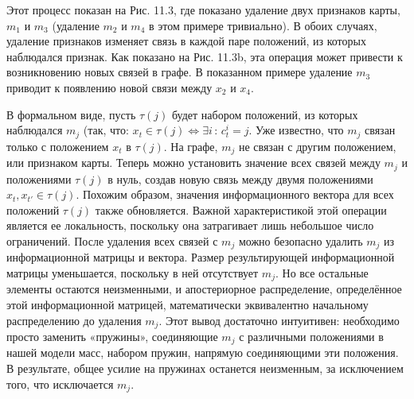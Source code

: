 \documentclass[10pt,a4paper]{article}
\begin{document}
Этот процесс показан на Рис. 11.3, где показано удаление двух признаков карты, $m_1$ и $m_3$ (удаление $m_2$ и $m_4$ в этом примере тривиально). В обоих случаях, удаление признаков изменяет связь в каждой паре положений, из которых наблюдался признак. Как показано на Рис. 11.3b, эта операция может привести к возникновению новых связей в графе. В показанном примере удаление $m_3$ приводит к появлению новой связи между $x_2$ и $x_4$.

В формальном виде, пусть $\tau(j)$ будет набором положений, из которых наблюдался $m_j$ (так, что: 
$x_t\in\tau(j)\Longleftrightarrow\exists i\,:\,c_t^i=j$.  Уже известно, что $m_j$ связан только с положением $x_t$ в $\tau(j)$. На графе, $m_j$ не связан с другим положением, или признаком карты. Теперь можно установить значение всех связей между $m_j$ и положениями $\tau(j)$ в нуль, создав новую связь между двумя положениями $x_t, x_{t'}\in\tau(j)$.  Похожим образом, значения информационного вектора для всех положений $\tau(j)$ также обновляется. Важной характеристикой этой операции является ее локальность, поскольку она затрагивает лишь небольшое число ограничений. После удаления всех связей с $m_j$ можно безопасно удалить $m_j$ из информационной матрицы и вектора. Размер результирующей информационной матрицы уменьшается, поскольку в ней отсутствует $m_j$. Но все остальные элементы остаются неизменными, и апостериорное распределение, определённое этой информационной матрицей, математически эквивалентно начальному распределению до удаления $m_j$. Этот вывод достаточно интуитивен: необходимо просто заменить «пружины», соединяющие $m_j$ с различными положениями в нашей модели масс, набором пружин, напрямую соединяющими эти положения. В результате, общее усилие на пружинах останется неизменным, за исключением того, что исключается $m_j$.
\end{document}
